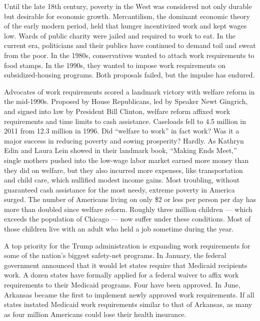 Until the late 18th century, poverty in the West was considered not only
durable but desirable for economic growth. Mercantilism, the dominant
economic theory of the early modern period, held that hunger
incentivized work and kept wages low. Wards of public charity were
jailed and required to work to eat. In the current era, politicians and
their publics have continued to demand toil and sweat from the poor. In
the 1980s, conservatives wanted to attach work requirements to food
stamps. In the 1990s, they wanted to impose work requirements on
subsidized-housing programs. Both proposals failed, but the impulse has
endured.

Advocates of work requirements scored a landmark victory with welfare
reform in the mid-1990s. Proposed by House Republicans, led by Speaker
Newt Gingrich, and signed into law by President Bill Clinton, welfare
reform affixed work requirements and time limits to cash assistance.
Caseloads fell to 4.5 million in 2011 from 12.3 million in 1996. Did
``welfare to work'' in fact work? Was it a major success in reducing
poverty and sowing prosperity? Hardly. As Kathryn Edin and Laura Lein
showed in their landmark book, ``Making Ends Meet,'' single mothers
pushed into the low-wage labor market earned more money than they did on
welfare, but they also incurred more expenses, like transportation and
child care, which nullified modest income gains. Most troubling, without
guaranteed cash assistance for the most needy, extreme poverty in
America surged. The number of Americans living on only \$2 or less per
person per day has more than doubled since welfare reform. Roughly three
million children --- which exceeds the population of Chicago --- now
suffer under these conditions. Most of those children live with an adult
who held a job sometime during the year.

A top priority for the Trump administration is expanding work
requirements for some of the nation's biggest safety-net programs. In
January, the federal government announced that it would let states
require that Medicaid recipients work. A dozen states have formally
applied for a federal waiver to affix work requirements to their
Medicaid programs. Four have been approved. In June, Arkansas became the
first to implement newly approved work requirements. If all states
instated Medicaid work requirements similar to that of Arkansas, as many
as four million Americans could lose their health insurance.


